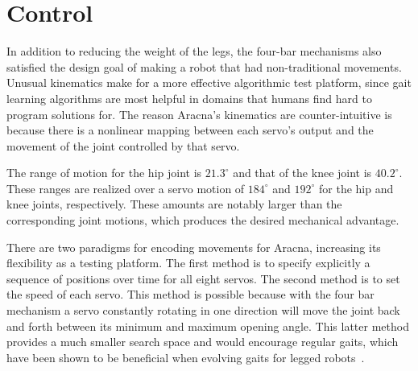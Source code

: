 \documentclass[letterpaper]{article}
\begin{document}
\begin{table}[h]
\vskip 0.25cm
\caption{Estimated total cost. The cost of components and printing material reflect market prices from March 2012. A complete parts list is on our website \citep{WEB}.}
\end{table}



\section{Control}

In addition to reducing the weight of the legs, the four-bar
mechanisms also satisfied the design goal of making a robot that had
non-traditional movements. Unusual kinematics make for a more
effective algorithmic test platform, since gait learning algorithms
are most helpful in domains that humans find hard to program solutions
for. The reason Aracna's kinematics are counter-intuitive is because
there is a nonlinear mapping between each servo's output and the
movement of the joint controlled by that
servo.

The range of motion for the hip joint is $21.3^\circ$ and that of the
knee joint is $40.2^\circ$.
These ranges are realized
over a servo motion of $184^\circ$ and $192^\circ$ for the hip and
knee joints, respectively. These amounts are notably larger than the
corresponding joint motions, which produces the desired mechanical
advantage.

There are two paradigms for encoding movements for Aracna, increasing
its flexibility as a testing platform. The first method is to specify
explicitly a sequence of positions over time for all eight servos.
The second method is to set the speed of each servo. This method is
possible because with the four bar mechanism a servo constantly
rotating in one direction will move the joint back and forth between
its minimum and maximum opening angle. This latter method provides a
much smaller search space and would encourage regular gaits, which
have been shown to be beneficial when evolving gaits for legged
robots~\citep{clune2011performance, hornby2005autonomous}.
\end{document}
